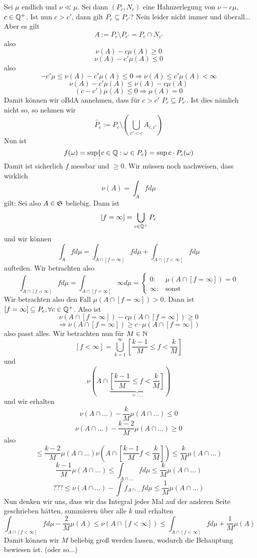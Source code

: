 	\begin{bew}
		Sei $\mu$ endlich und $\nu\ll\mu$. Sei dann $(P_c, N_c)$ eine Hahnzerlegung von $\nu-c\mu$, $c\in\Q^+$. Ist nun $c>c'$, dann gilt $P_c\subseteq P_{c'}$? Nein leider nicht immer und überall... Aber es gilt
		\[ A:=P_c\setminus P_{c'}=P_c\cap N_{c'} \]
		also
		\[ \nu(A)-c\mu(A)\ge 0 \]
		\[ \nu(A)-c'\mu(A)\le 0 \]
		also
		\[ -c'\mu\le\nu(A)-c'\mu(A)\le  0\Rightarrow \nu(A)\le c'\mu(A)<\infty \]
		\[ \nu(A)-c'\mu(A)\le\nu(A)-c\mu(A) \]
		\[ (c-c')\mu(A)\le 0\Rightarrow \mu(A)=0 \]
		Damit können wir oBdA annehmen, dass für $c>c'$ $P_c\subseteq P_{c'}$. Ist dies nämlich nicht so, so nehmen wir
		\[ \tilde{P_c}:=P_c\setminus\left(\bigcup_{c'<c} A_{c,c'}\right) \]
		Nun ist 
		\[ f(\omega)=\sup\{c\in\Q: \omega\in P_c\}=\sup c\cdot P_c(\omega) \]
		Damit ist sicherlich $f$ messbar und $\ge 0$. Wir müssen noch nachweisen, dass wirklich 
		\[ \nu(A)=\int_A fd\mu \]
		gilt:\newline
		Sei also $A\in\S$ beliebig. Dann ist 
		\[ [f=\infty] = \bigcup_{c\in\Q^+} P_c \]
		und wir können 
		\[ \int_A fd\mu=\int_{A\cap [f=\infty]} fd\mu+\int_{A\cap[f<\infty]} fd\mu \]
		aufteilen. Wir betrachten also
		\[ \int_{A\cap[f=\infty]} fd\mu=\int_{A\cap[f=\infty]}\infty d\mu=\begin{cases}
			0: &\mu(A\cap[f=\infty])=0\\
			\infty: &\text{sonst}
			\end{cases} \]
		Wir betrachten also den Fall $\mu(A\cap[f=\infty])>0$. Dann ist $[f=\infty]\subseteq P_c, \forall c\in \Q^+$. Also ist
		\[ \nu(A\cap[f=\infty])-c\mu(A\cap[f=\infty])\ge 0 \]
		\[ \Rightarrow \nu(A\cap[f=\infty])\ge c\cdot\mu(A\cap[f=\infty]) \]
		also passt alles.\newline
		Wir betrachten nun für $M\in\N$
		\[ [ f<\infty]=\bigcup_{k=1}^\infty\left[\frac{k-1}{M}\le f<\frac{k}{M}\right] \]
		und
		\[ \nu\left(A\cap \underbrace{\left[\frac{k-1}{M}\le f<\frac{k}{M}\right]}_{=: ...}\right) \]
		und wir erhalten
		\[ \nu(A\cap ...)-\frac{k}{M}\mu(A\cap ...)\le 0 \]
		\[ \nu(A\cap ...)-\frac{k-2}{M}\mu(A\cap ...)\ge 0 \]
		also 
		\[ \le\frac{k-2}{M}\mu(A\cap ...)\nu(A\cap[\frac{k-1}{M}f<\frac{k}{M}])\le \frac{k}{M}\mu(A\cap ...) \]
		\[ \frac{k-1}{M}\mu(A\cap ...)\le\int_{A\cap ...} fd\mu\le \frac{k}{M}\mu(A\cap ...) \]
		\[ ???\le\nu(A\cap ...)-\int f_{A\cap ...} fd\mu\le\frac{1}{M}\mu(A\cap ...) \]
		Nun denken wir uns, dass wir das Integral jedes Mal auf der anderen Seite geschrieben hätten, summieren über alle $k$ und erhalten
		\[ \int_{A\cap [f<\infty]} fd\mu-\frac{2}{M}\mu(A)\le\nu(A\cap[f<\infty])\le \int_{A\cap[f<\infty]} fd\mu+\frac{1}{M}\mu(A) \]
		Damit können wir $M$ beliebig groß werden lassen, wodurch die Behauptung bewiesen ist. (oder so...)
	\end{bew}

	